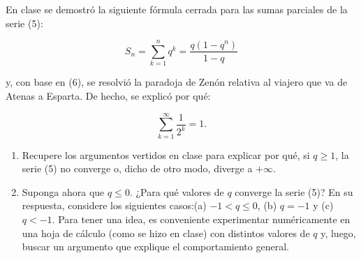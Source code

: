 \documentclass[12pt]{article}
\begin{document}
    En clase se demostró la siguiente fórmula cerrada para las sumas parciales de la serie (5):

    \[S_n = \sum_{k=1}^{n} q^k = \frac{q (1 - q^n)}{1 - q} \tag{6}\]

    y, con base en (6), se resolvió la paradoja de Zenón relativa al viajero que va de Atenas a Esparta. De hecho, se explicó por qué:

    \[\sum_{k=1}^{\infty} \frac{1}{2^k} = 1.\]

    \begin{enumerate}
    
        \item Recupere los argumentos vertidos en clase para explicar por qué, si $q \geq 1$, la serie (5) no converge o, dicho de otro modo, diverge a $+\infty$.\\

        \item Suponga ahora que $q \leq 0$. ¿Para qué valores de $q$ converge la serie (5)? En su respuesta, considere los siguientes casos:(a) $-1 < q \leq 0$, (b) $q = -1$ y (c)$q < -1$. Para tener una idea, es conveniente experimentar numéricamente en una hoja de cálculo (como se hizo en clase) con distintos valores de $q$ y, luego, buscar un argumento que explique el comportamiento general.
    \end{enumerate}
\end{document}
